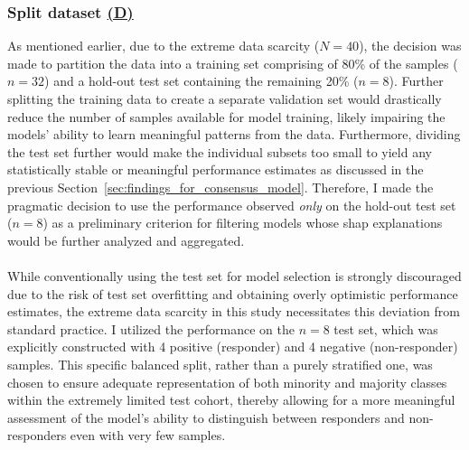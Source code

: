 \documentclass[12pt,a4paper]{report}
\begin{document}
\subsubsection*{Split dataset \hyperref[fig:pipeline-2]{(D)}}
As mentioned earlier, due to the extreme data scarcity ($N=40$), the decision was made to partition the data into a training set comprising of 80\% of the samples ($n=32$) and a hold-out test set containing the remaining 20\% ($n=8$). Further splitting the training data to create a separate validation set would drastically reduce the number of samples available for model training, likely impairing the models' ability to learn meaningful patterns from the data. Furthermore, dividing the test set further would make the individual subsets too small to yield any statistically stable or meaningful performance estimates as discussed in the previous Section~\ref{sec:findings_for_consensus_model}. Therefore, I made the pragmatic decision to use the performance observed \textit{only} on the hold-out test set ($n=8$) as a preliminary criterion for filtering models whose \gls{shap} explanations would be further analyzed and aggregated.\\
\\
While conventionally using the test set for model selection is strongly discouraged due to the risk of test set overfitting and obtaining overly optimistic performance estimates, the extreme data scarcity in this study necessitates this deviation from standard practice. I utilized the performance on the $n=8$ test set, which was explicitly constructed with 4 positive (responder) and 4 negative (non-responder) samples. This specific balanced split, rather than a purely stratified one, was chosen to ensure adequate representation of both minority and majority classes within the extremely limited test cohort, thereby allowing for a more meaningful assessment of the model's ability to distinguish between responders and non-responders even with very few samples.\\
\\
\end{document}
